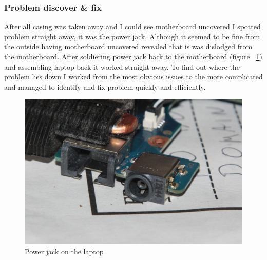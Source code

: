 \documentclass[10pt,a4paper,headinclude=true]{report}
\begin{document}
\subsubsection{Problem discover \& fix}
After all casing was taken away and I could see motherboard uncovered I spotted problem straight away, it was the power jack. Although it seemed to be fine from the outside having motherboard uncovered revealed that is was dislodged from the motherboard. After soldiering power jack back to the motherboard (figure ~\ref{fig:power jack}) and assembling laptop back it worked straight away. To find out where the problem lies down I worked from the most obvious issues to the more complicated and managed to identify and fix problem quickly and efficiently.

\begin{figure}[H]
\centering
\centerline{\includegraphics[scale=0.4]{./powerJack}}
\caption{Power jack on the laptop}
\label{fig:power jack}
\end{figure}
\end{document}

